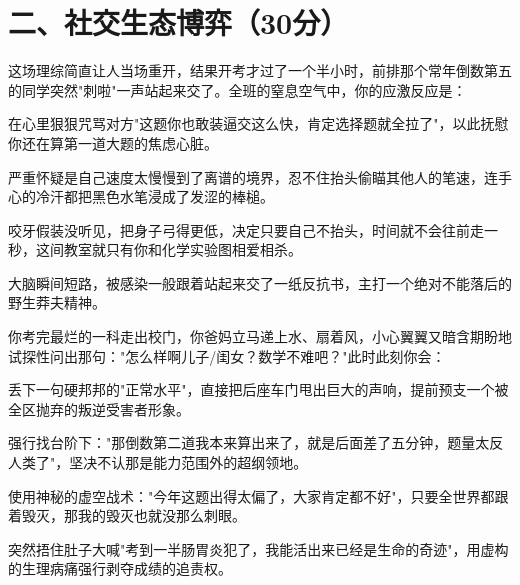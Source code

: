 \documentclass{exam-zh}
\begin{document}
\section{二、社交生态博弈（30分）}

\begin{question}[points = 5]
  这场理综简直让人当场重开，结果开考才过了一个半小时，前排那个常年倒数第五的同学突然"刺啦"一声站起来交了。全班的窒息空气中，你的应激反应是：
  \begin{choices}
    \item 在心里狠狠咒骂对方"这题你也敢装逼交这么快，肯定选择题就全拉了"，以此抚慰你还在算第一道大题的焦虑心脏。
    \item 严重怀疑是自己速度太慢慢到了离谱的境界，忍不住抬头偷瞄其他人的笔速，连手心的冷汗都把黑色水笔浸成了发涩的棒槌。
    \item 咬牙假装没听见，把身子弓得更低，决定只要自己不抬头，时间就不会往前走一秒，这间教室就只有你和化学实验图相爱相杀。
    \item 大脑瞬间短路，被感染一般跟着站起来交了一纸反抗书，主打一个绝对不能落后的野生莽夫精神。
  \end{choices}
\end{question}

\begin{question}[points = 5]
  你考完最烂的一科走出校门，你爸妈立马递上水、扇着风，小心翼翼又暗含期盼地试探性问出那句："怎么样啊儿子/闺女？数学不难吧？"此时此刻你会：
  \begin{choices}
    \item 丢下一句硬邦邦的"正常水平"，直接把后座车门甩出巨大的声响，提前预支一个被全区抛弃的叛逆受害者形象。
    \item 强行找台阶下："那倒数第二道我本来算出来了，就是后面差了五分钟，题量太反人类了"，坚决不认那是能力范围外的超纲领地。
    \item 使用神秘的虚空战术："今年这题出得太偏了，大家肯定都不好"，只要全世界都跟着毁灭，那我的毁灭也就没那么刺眼。
    \item 突然捂住肚子大喊"考到一半肠胃炎犯了，我能活出来已经是生命的奇迹"，用虚构的生理病痛强行剥夺成绩的追责权。
  \end{choices}
\end{question}
\end{document}
